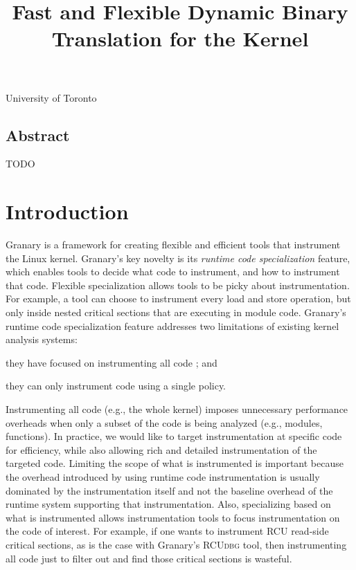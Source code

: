 \documentclass[preprint]{sigplanconf}
\newcommand{\toolname}[1]{{\scshape #1}}
\begin{document}
\title{Fast and Flexible Dynamic Binary Translation for the Kernel}

{University of Toronto}{}

\maketitle
\subsection*{Abstract}
TODO

\section{Introduction}\label{sec:intro}

Granary is a framework for creating flexible and efficient tools that instrument the Linux kernel. Granary's key novelty is its \emph{runtime code specialization} feature, which enables tools to decide what code to instrument, and how to instrument that code. Flexible specialization allows tools to be picky about instrumentation. For example, a tool can choose to instrument every load and store operation, but only inside nested critical sections that are executing in module code. Granary's runtime code specialization feature addresses two limitations of existing kernel analysis systems: \begin{inparaenum}[i)]
	\item they have focused on instrumenting all code \cite{DRK,btkernel,QEMU}; and
	\item they can only instrument code using a single policy.
\end{inparaenum}

Instrumenting all code (e.g., the whole kernel) imposes unnecessary performance overheads when only a subset of the code is being analyzed (e.g., modules, functions). In practice, we would like to target instrumentation at specific code for efficiency, while also allowing rich and detailed instrumentation of the targeted code. Limiting the scope of what is instrumented is  important because the overhead introduced by using runtime code instrumentation is usually dominated by the instrumentation itself and not the baseline overhead of the runtime system supporting that instrumentation. Also, specializing based on what is instrumented allows instrumentation tools to focus instrumentation on the code of interest. For example, if one wants to instrument RCU read-side critical sections, as is the case with Granary's \toolname{RCUdbg} tool, then instrumenting all code just to filter out and find those critical sections is wasteful.
\end{document}

